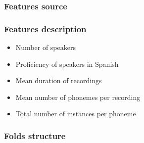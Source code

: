 \subsubsection{Features source}
\subsubsection{Features description}
	\begin{itemize}
		\item Number of speakers
		\item Proficiency of speakers in Spanish
		\item Mean duration of recordings
		\item Mean number of phonemes per recording
		\item Total number of instances per phoneme
	\end{itemize}
\subsubsection{Folds structure}